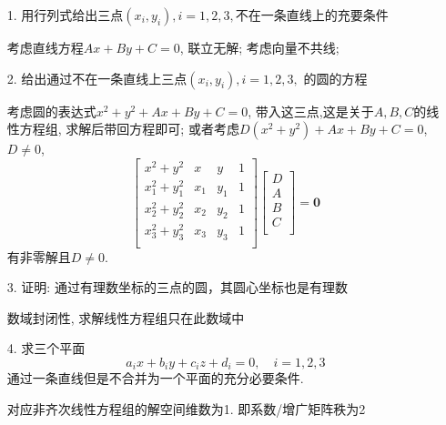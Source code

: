 \begin{itemize}
	\item[1.] 用行列式给出三点$(x_i,y_i), i=1,2,3,$不在一条直线上的充要条件
	\begin{solution}
		考虑直线方程$Ax+By+C=0$, 联立无解; 考虑向量不共线;
	\end{solution}
	\vspace{2cm}

	\item[2.] 给出通过不在一条直线上三点$(x_i,y_i), i=1,2,3,$
	的圆的方程
	\begin{solution}
	考虑圆的表达式$x^2 + y^2 + Ax + By + C=0$, 
	带入这三点,这是关于$A, B, C$的线性方程组, 求解后带回方程即可;
	或者考虑$D(x^2 + y^2) + Ax + By + C=0$, $D \ne 0$,
	\begin{equation*}
	\begin{bmatrix}
	x^2+y^2& x& y& 1\\	
	x_1^2+y_1^2& x_1& y_1& 1\\	
	x_2^2+y_2^2& x_2& y_2& 1\\	
	x_3^2+y_3^2& x_3& y_3& 1\\	
	\end{bmatrix}
	\begin{bmatrix}
		D\\
		A\\
		B\\
		C\\
	\end{bmatrix}
	= \mathbf{0}
	\end{equation*}
	有非零解且$D\ne 0$.
	\end{solution}
	\vspace{2cm}

	\item[3.] 证明: 通过有理数坐标的三点的圆，其圆心坐标也是有理数
	\begin{solution}
		数域封闭性, 求解线性方程组只在此数域中
	\end{solution}
	\vspace{2cm}

	\item[4.] 求三个平面
	$$a_i x + b_i y + c_i z + d_i = 0, \quad i=1,2,3$$
	通过一条直线但是不合并为一个平面的充分必要条件.
	\begin{solution}
	对应非齐次线性方程组的解空间维数为1.
	即系数/增广矩阵秩为2
	\end{solution}
	\vspace{2cm}


\end{itemize}
